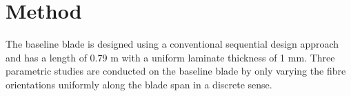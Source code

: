 \documentclass[a4paper]{jpconf}
\begin{document}


\section{Method}
\label{sec:method}
The baseline blade is designed using a conventional sequential design approach and has a length of 0.79 m with a uniform laminate thickness of 1 mm. Three parametric studies are conducted on the baseline blade by only varying the fibre orientations uniformly along the blade span in a discrete sense. 
\end{document}
